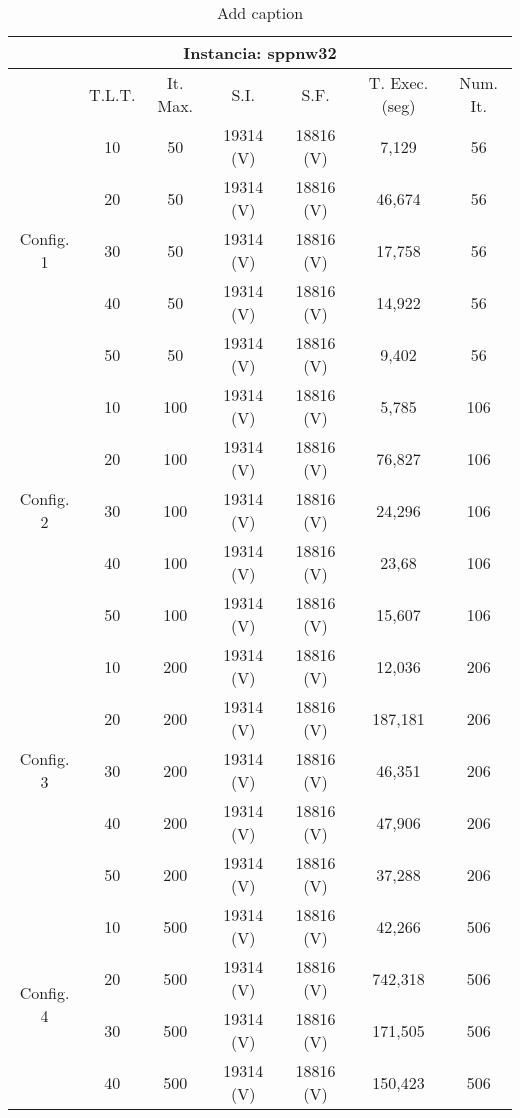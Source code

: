 \begin{table}[htbp]
  \centering
  \caption{Add caption}
    \begin{tabular}{c|c|c|c|c|c|c}
    \toprule
    \multicolumn{7}{c}{Instancia: sppnw32} \\
    \midrule
          & T.L.T. & It. Max. & S.I.  & S.F.  & T. Exec. (seg) & Num. It. \\
	\hline
    \multirow{5}[0]{*}{Config. 1} & 10    & 50    & 19314 (V) & 18816 (V) & 7,129 & 56 \\
          & 20    & 50    & 19314 (V) & 18816 (V) & 46,674 & 56 \\
          & 30    & 50    & 19314 (V) & 18816 (V) & 17,758 & 56 \\
          & 40    & 50    & 19314 (V) & 18816 (V) & 14,922 & 56 \\
          & 50    & 50    & 19314 (V) & 18816 (V) & 9,402 & 56 \\
	\hline
    \multirow{5}[0]{*}{Config. 2} & 10    & 100   & 19314 (V) & 18816 (V) & 5,785 & 106 \\
          & 20    & 100   & 19314 (V) & 18816 (V) & 76,827 & 106 \\
          & 30    & 100   & 19314 (V) & 18816 (V) & 24,296 & 106 \\
          & 40    & 100   & 19314 (V) & 18816 (V) & 23,68 & 106 \\
          & 50    & 100   & 19314 (V) & 18816 (V) & 15,607 & 106 \\
    \hline
	\multirow{5}[0]{*}{Config. 3} & 10    & 200   & 19314 (V) & 18816 (V) & 12,036 & 206 \\
          & 20    & 200   & 19314 (V) & 18816 (V) & 187,181 & 206 \\
          & 30    & 200   & 19314 (V) & 18816 (V) & 46,351 & 206 \\
          & 40    & 200   & 19314 (V) & 18816 (V) & 47,906 & 206 \\
          & 50    & 200   & 19314 (V) & 18816 (V) & 37,288 & 206 \\
    \hline
	\multirow{5}[0]{*}{Config. 4} & 10    & 500   & 19314 (V) & 18816 (V) & 42,266 & 506 \\
          & 20    & 500   & 19314 (V) & 18816 (V) & 742,318 & 506 \\
          & 30    & 500   & 19314 (V) & 18816 (V) & 171,505 & 506 \\
          & 40    & 500   & 19314 (V) & 18816 (V) & 150,423 & 506 \\

\end{tabular}
\end{table}
